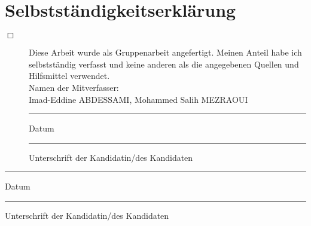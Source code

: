 \chapter{Selbstständigkeitserklärung}

\begin{description}


\item[$\Box$] Diese Arbeit wurde als Gruppenarbeit angefertigt. Meinen Anteil habe ich selbstständig verfasst und keine anderen als die angegebenen Quellen und Hilfsmittel verwendet.\\

Namen der Mitverfasser: \\

Imad-Eddine ABDESSAMI,
Mohammed Salih MEZRAOUI
\vspace{3cm}


\begin{minipage}[t]{3cm}
	\rule{3cm}{0.5pt}
	Datum
\end{minipage}
\hfill
\begin{minipage}[t]{9cm}
	\rule{9cm}{0.5pt}
	Unterschrift der Kandidatin/des Kandidaten
\end{minipage}


\end{description}

\vspace{2cm}

\begin{minipage}[t]{3cm}
	\rule{3cm}{0.5pt}
	Datum
\end{minipage}
\hfill
\begin{minipage}[t]{9cm}
	\rule{9cm}{0.5pt}
	Unterschrift der Kandidatin/des Kandidaten
\end{minipage}
